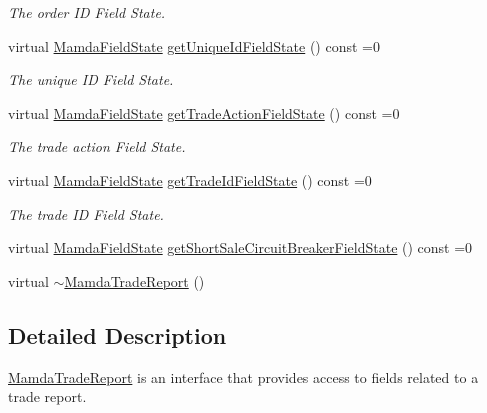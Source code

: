 \begin{CompactItemize}
\begin{CompactList}\small\item\em The order ID Field State. \item\end{CompactList}\item 
virtual \hyperlink{namespaceWombat_93aac974f2ab713554fd12a1fa3b7d2a}{Mamda\-Field\-State} \hyperlink{classWombat_1_1MamdaTradeReport_32722ba8f872d14f9790fd3869b17640}{get\-Unique\-Id\-Field\-State} () const =0
\begin{CompactList}\small\item\em The unique ID Field State. \item\end{CompactList}\item 
virtual \hyperlink{namespaceWombat_93aac974f2ab713554fd12a1fa3b7d2a}{Mamda\-Field\-State} \hyperlink{classWombat_1_1MamdaTradeReport_c5344ba42657f2ba5a35c30240a384f1}{get\-Trade\-Action\-Field\-State} () const =0
\begin{CompactList}\small\item\em The trade action Field State. \item\end{CompactList}\item 
virtual \hyperlink{namespaceWombat_93aac974f2ab713554fd12a1fa3b7d2a}{Mamda\-Field\-State} \hyperlink{classWombat_1_1MamdaTradeReport_9ff0c7bf7e478588bb42718123fc62ca}{get\-Trade\-Id\-Field\-State} () const =0
\begin{CompactList}\small\item\em The trade ID Field State. \item\end{CompactList}\item 
virtual \hyperlink{namespaceWombat_93aac974f2ab713554fd12a1fa3b7d2a}{Mamda\-Field\-State} \hyperlink{classWombat_1_1MamdaTradeReport_346b7f2e68f75aef22d4a0c8640f1bf4}{get\-Short\-Sale\-Circuit\-Breaker\-Field\-State} () const =0
\item 
virtual \hyperlink{classWombat_1_1MamdaTradeReport_ea6554151d67418f4865dc9ba3bf22b9}{$\sim$Mamda\-Trade\-Report} ()
\end{CompactItemize}


\subsection{Detailed Description}
\hyperlink{classWombat_1_1MamdaTradeReport}{Mamda\-Trade\-Report} is an interface that provides access to fields related to a trade report. 

